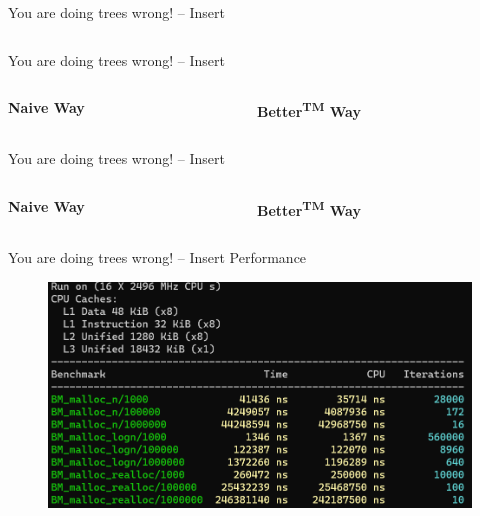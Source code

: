 \documentclass{beamer}
\begin{document}
\begin{frame}{You are doing trees wrong! -- Insert}
	\begin{columns}[c]
	\end{columns}
\end{frame}

\begin{frame}{You are doing trees wrong! -- Insert}
	\begin{columns}[c]
		\begin{column}[t]{.5\linewidth}{\textbf{Naive Way}}
			
		\end{column}
		\begin{column}[t]{.5\linewidth}{\textbf{Better\textsuperscript{TM} Way}}
			
		\end{column}
	\end{columns}
\end{frame}

\begin{frame}{You are doing trees wrong! -- Insert}
	\begin{columns}[c]
		\begin{column}[t]{.5\linewidth}{\textbf{Naive Way}}
			
		\end{column}
		\begin{column}[t]{.5\linewidth}{\textbf{Better\textsuperscript{TM} Way}}
			
		\end{column}
	\end{columns}
\end{frame}

\begin{frame}{You are doing trees wrong! -- Insert Performance}
	\begin{figure}
		\centering
		\includegraphics[width=\linewidth]{img/benchmarks.png}
	\end{figure}
\end{frame}
\end{document}
